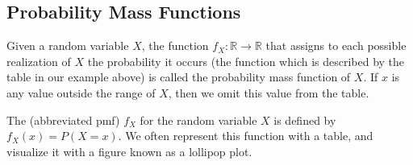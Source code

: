 



\subsection*{Probability Mass Functions}


Given a random variable $X$, the function $f_X: \mathbb{R} \to \mathbb{R}$ that assigns to each possible realization of $X$ the probability it occurs (the function which is described by the table in our example above) is called the probability mass function of $X$. If $x$ is any value outside the range of $X$, then we omit this value from the table.

\begin{definition}
The  (abbreviated pmf) $f_X$ for the random variable $X$ is defined by $f_X(x) = P(X = x)$. We often represent this function with a table, and visualize it with a figure known as a lollipop plot.
\end{definition}

